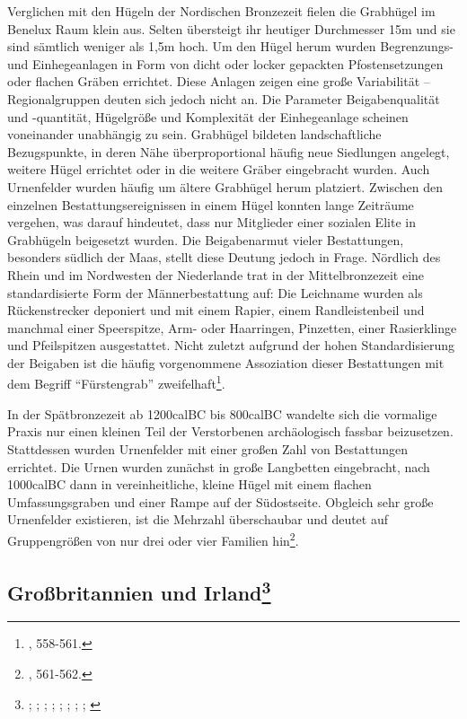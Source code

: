\documentclass[openany,twoside,twocolumn]{book}
\let\rmarkdownfootnote\footnote%
\def\footnote{\protect\rmarkdownfootnote}
\begin{document}
Verglichen mit den Hügeln der Nordischen Bronzezeit fielen die Grabhügel
im Benelux Raum klein aus. Selten übersteigt ihr heutiger Durchmesser
15m und sie sind sämtlich weniger als 1,5m hoch. Um den Hügel herum
wurden Begrenzungs- und Einhegeanlagen in Form von dicht oder locker
gepackten Pfostensetzungen oder flachen Gräben errichtet. Diese Anlagen
zeigen eine große Variabilität -- Regionalgruppen deuten sich jedoch
nicht an. Die Parameter Beigabenqualität und -quantität, Hügelgröße und
Komplexität der Einhegeanlage scheinen voneinander unabhängig zu sein.
Grabhügel bildeten landschaftliche Bezugspunkte, in deren Nähe
überproportional häufig neue Siedlungen angelegt, weitere Hügel
errichtet oder in die weitere Gräber eingebracht wurden. Auch
Urnenfelder wurden häufig um ältere Grabhügel herum platziert. Zwischen
den einzelnen Bestattungsereignissen in einem Hügel konnten lange
Zeiträume vergehen, was darauf hindeutet, dass nur Mitglieder einer
sozialen Elite in Grabhügeln beigesetzt wurden. Die Beigabenarmut vieler
Bestattungen, besonders südlich der Maas, stellt diese Deutung jedoch in
Frage. Nördlich des Rhein und im Nordwesten der Niederlande trat in der
Mittelbronzezeit eine standardisierte Form der Männerbestattung auf: Die
Leichname wurden als Rückenstrecker deponiert und mit einem Rapier,
einem Randleistenbeil und manchmal einer Speerspitze, Arm- oder
Haarringen, Pinzetten, einer Rasierklinge und Pfeilspitzen ausgestattet.
Nicht zuletzt aufgrund der hohen Standardisierung der Beigaben ist die
häufig vorgenommene Assoziation dieser Bestattungen mit dem Begriff
``Fürstengrab'' zweifelhaft\footnote{\textcite{fokkens_bronze_2013},
  558-561.}.

In der Spätbronzezeit ab 1200calBC bis 800calBC wandelte sich die
vormalige Praxis nur einen kleinen Teil der Verstorbenen archäologisch
fassbar beizusetzen. Stattdessen wurden Urnenfelder mit einer großen
Zahl von Bestattungen errichtet. Die Urnen wurden zunächst in große
Langbetten eingebracht, nach 1000calBC dann in vereinheitliche, kleine
Hügel mit einem flachen Umfassungsgraben und einer Rampe auf der
Südostseite. Obgleich sehr große Urnenfelder existieren, ist die
Mehrzahl überschaubar und deutet auf Gruppengrößen von nur drei oder
vier Familien hin\footnote{\textcite{fokkens_bronze_2013}, 561-562.}.

\hypertarget{great-britain-irland}{%
\subsection[Großbritannien und Irland]{\texorpdfstring{Großbritannien
und Irland\footnote{\textcite{bradley_prehistory_2007};
  \textcite{bruck_bronze_2001}; \textcite{bruck_death_2006};
  \textcite{burgess_age_1980}; \textcite{eogan_construction_2004};
  \textcite{medina-pettersson_bronze_2014};
  \textcite{roberts_britain_2013}; \textcite{rogers_afterlife_2013};
  \textcite{waddell_bronze_1990}}}{Großbritannien und Irland}}\label{great-britain-irland}}
\end{document}
